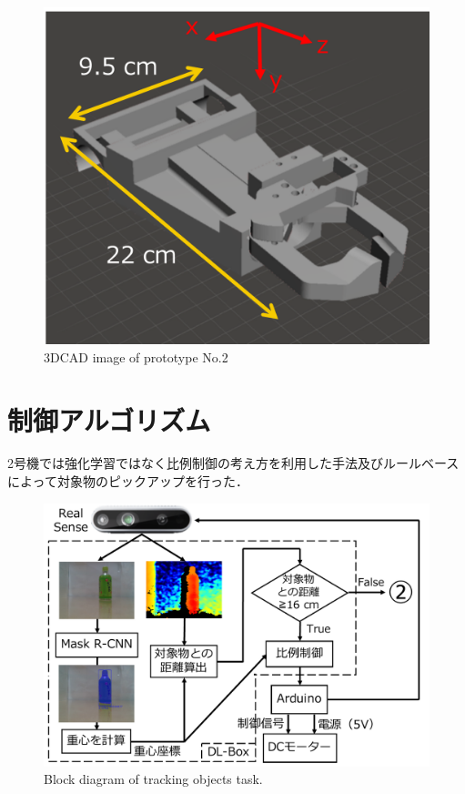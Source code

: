 \begin{figure}
    \centering
    \includegraphics[width=\linewidth]{figure/chapter4/2号機CAD-2}
    \caption{3DCAD image of prototype No.2}
    \label{fig:2号機CAD}
\end{figure}


\section{制御アルゴリズム}
2号機では強化学習ではなく比例制御の考え方を利用した手法及びルールベースによって対象物のピックアップを行った．

\begin{figure}
    \centering
    \includegraphics[width=0.7\linewidth]{figure/chapter4/2号機制御図_接近-2}
    \caption{Block diagram of tracking objects task.}
    \label{fig:2号機接近}
\end{figure}


